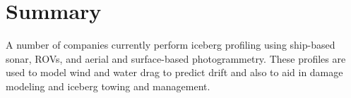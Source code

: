 %
%
%
%
%


\section{Summary}

A number of companies currently perform iceberg profiling using ship-based sonar, ROVs, and aerial and surface-based photogrammetry. These profiles are used to model wind and water drag to predict drift and also to aid in damage modeling and iceberg towing and management. 

